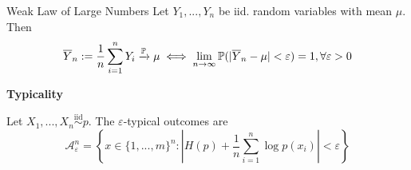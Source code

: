 \begin{mainbox}
    {Weak Law of Large Numbers}
    Let \(Y_1, ..., Y_n\) be iid. random variables with mean \(\mu\). Then 
    \[\overline{Y}_n := \frac{1}{n}\sum_{i = 1}^n Y_i \xrightarrow[]{\P} \mu \iff \lim_{n \to \infty}\P(|\overline{Y}_n - \mu| < \varepsilon) = 1, \forall \varepsilon > 0\]
\end{mainbox}

\textbf{Typicality}

Let \(X_1, ..., X_n \overset{\text{iid}}{\sim} p\). The \(\varepsilon\)-typical outcomes are 
\[\mathcal{A}_\varepsilon^n = \left\{x \in \{1, ..., m\}^n:\left|H(p)+ \frac{1}{n}\sum_{i = 1}^n \log p(x_i)\right| < \varepsilon\right\}\]




